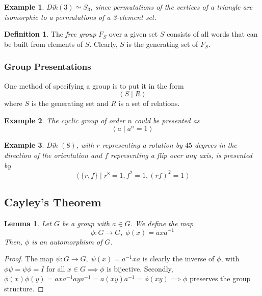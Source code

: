 \documentclass{article}
\newtheorem{lemma}[theorem]{Lemma}
\newtheorem{example}{Example}[section]
\theoremstyle{remark}
\theoremstyle{definition}
\newtheorem{definition}{Definition}[section]
\begin{document}
\begin{example}
Dih$(3) \simeq S_{3}$, since permutations of the vertices of a triangle are isomorphic to a permutations of a 3-element set. 
\end{example}

\begin{definition}
The \textit{free group} $F_{S}$ over a given set $S$ consists of all words that can be built from elements of $S$. Clearly, $S$ is the generating set of $F_{S}$. 
\end{definition}

\subsubsection{Group Presentations}
One method of specifying a group is to put it in the form
\[ \big\langle \; S \; | \; R \;\big\rangle \]
where $S$ is the generating set and $R$ is a set of relations. 

\begin{example}
The cyclic group of order $n$ could be presented as
\[ \big\langle \; a \; | \; a^{n} = 1 \;\big\rangle \]
\end{example}

\begin{example}
Dih $(8)$, with $r$ representing a rotation by $45$ degrees in the direction of the orientation and $f$ representing a flip over any axis, is presented by
\[ \big\langle \; \{ r, f\} \; | \; r^{8} = 1, f^{2} = 1, (r f)^{2} = 1 \;\big\rangle \]
\end{example}

\subsection{Cayley's Theorem}

\begin{lemma}
Let $G$ be a group with $a \in G$. We define the map
\[ \phi: G \longrightarrow G, \; \phi (x) = a x a^{-1}\]
Then, $\phi$ is an automorphism of $G$. 
\end{lemma}
\begin{proof}
The map $\psi: G \longrightarrow G, \; \psi(x) = a^{-1} x a$ is clearly the inverse of $\phi$, with $\phi \psi = \psi \phi = I$ for all $x \in G \implies \phi$ is bijective. Secondly, $\phi(x) \phi(y) = a x a^{-1} a y a^{-1} = a (x y) a ^{-1} = \phi (x y) \implies \phi$ preserves the group structure. 
\end{proof}
\end{document}
